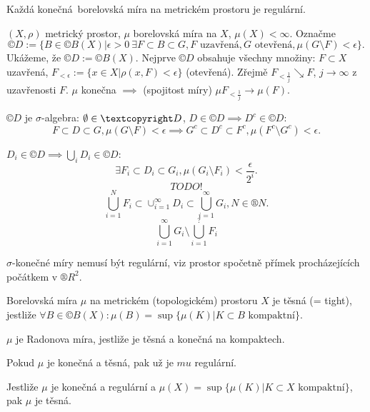 \documentclass[12pt]{article}					%
\begin{document}
\begin{veta}
	Každá konečná borelovská míra na metrickém prostoru je regulární.

	\begin{dukazin}
		$(X, \rho)$ metrický prostor, $\mu$ borelovská míra na $X$, $\mu(X) < ∞$. Označme
		$$ ©D := \{B \in ©B(X) | \epsilon > 0 \ \exists F \subset B \subset G, F \text{ uzavřená}, G \text{ otevřená}, \mu(G \setminus F) < \epsilon\}. $$
		Ukážeme, že $©D := ©B(X)$. Nejprve $©D$ obsahuje všechny množiny: $F \subset X$ uzavřená, $F_{<\epsilon} := \{x \in X | \rho(x, F) < \epsilon\}$ (otevřená). Zřejmě $F_{<\frac{1}{j}} \searrow F$, $j \rightarrow ∞$ z uzavřenosti $F$. $\mu$ konečna $\implies$ (spojitost míry) $\mu F_{<\frac{1}{j}} \rightarrow \mu(F)$.

		$©D$ je $\sigma$-algebra: $\O \in ©D$, $D \in ©D \implies D^c \in ©D$:
		$$ F \subset D \subset G, \mu(G \setminus F) < \epsilon \implies G^c \subset D^c \subset F^c, \mu(F^c \setminus G^c) < \epsilon. $$

		$D_i \in ©D \implies \bigcup_i D_i \in ©D$:
		$$ \exists F_i \subset D_i \subset G_i, \mu(G_i \setminus F_i) < \frac{\epsilon}{2^i}. $$
		$$ TODO! $$
		$$ \bigcup_{i=1}^N F_i \subset \cup_{i=1}^∞ D_i \subset \bigcup_{i = 1}^∞ G_i, N \in ®N. $$
		$$ \bigcup_{i=1}^∞ G_i \setminus \bigcup_{i=1}^?F_i $$
	\end{dukazin}


	\begin{poznamkain}
		$\sigma$-konečné míry nemusí být regulární, viz prostor spočetně přímek procházejících počátkem v $®R^2$.
	\end{poznamkain}
\end{veta}

\begin{definice}[Těsnost (= vnitřní regularita)]
	Borelovská míra $\mu$ na metrickém (topologickém) prostoru $X$ je těsná (= tight), jestliže $\forall B \in ©B(X): \mu(B) = \sup\{\mu(K) | K \subset B \text{ kompaktní}\}$.
\end{definice}

\begin{poznamka}
	$\mu$ je Radonova míra, jestliže je těsná a konečná na kompaktech.

	Pokud $\mu$ je konečná a těsná, pak už je $mu$ regulární.

	Jestliže $\mu$ je konečná a regulární a $\mu(X) = \sup\{\mu(K) | K \subset X \text{ kompaktní}\}$, pak $\mu$ je těsná.
\end{poznamka}
\end{document}
